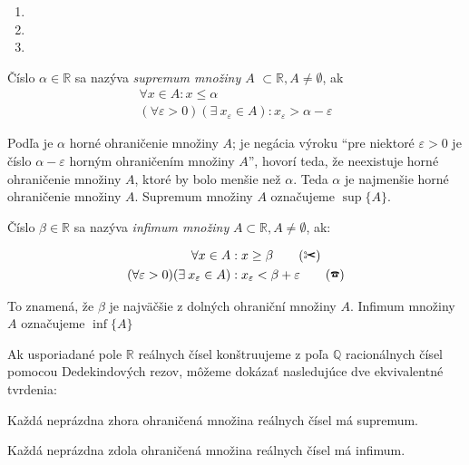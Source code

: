 \begin{enumerate}[resume]
	\item {}
	\item {}
	\item {}
\end{enumerate}


Číslo $\alpha \in \mathbb{R}$ sa nazýva \textit{supremum množiny $A$}
$\subset \mathbb{R}, A \neq \emptyset$, ak
\begin{align}
\forall x \in A: x \leq \alpha \label{eq:supremum-i} \\
(\forall \varepsilon > 0) (\exists \: x_\varepsilon \in A):
x_\varepsilon > \alpha - \varepsilon
\end{align}

Podľa  je $\alpha$ horné ohraničenie množiny $A$;  je negácia
výroku ``pre niektoré $\varepsilon > 0$ je číslo $\alpha - \varepsilon$ horným
ohraničením množiny $A$'', hovorí teda, že neexistuje horné ohraničenie množiny
$A$, ktoré by bolo menšie než $\alpha$. Teda $\alpha$ je najmenšie horné
ohraničenie množiny $A$. Supremum množiny $A$ označujeme $\sup \{ A \}$.

Číslo $\beta \in \mathbb{R}$ sa nazýva \textit{infimum množiny} $A \subset
\mathbb{R}, A \neq \emptyset$, ak:

\begin{align*}
  \forall x \in A&: x \geq \beta \tag{\ding{34}} \\
  (\forall \varepsilon > 0) (\exists \: x_\varepsilon \in A)&:
  x_\varepsilon < \beta + \varepsilon \tag{\ding{37}}
\end{align*}

To znamená, že $\beta$ je najväčšie z dolných ohraniční množiny $A$. Infimum
množiny $A$ označujeme $\inf\{A\}$

Ak usporiadané pole $\mathbb{R}$ reálnych čísel konštruujeme z poľa
$\mathbb{Q}$ racionálnych čísel pomocou Dedekindových rezov, môžeme dokázať
nasledujúce dve ekvivalentné tvrdenia:

\begin{veta}
Každá neprázdna zhora ohraničená množina reálnych čísel má supremum.
\end{veta}

\begin{veta}
Každá neprázdna zdola ohraničená množina reálnych čísel má infimum.
\end{veta}

